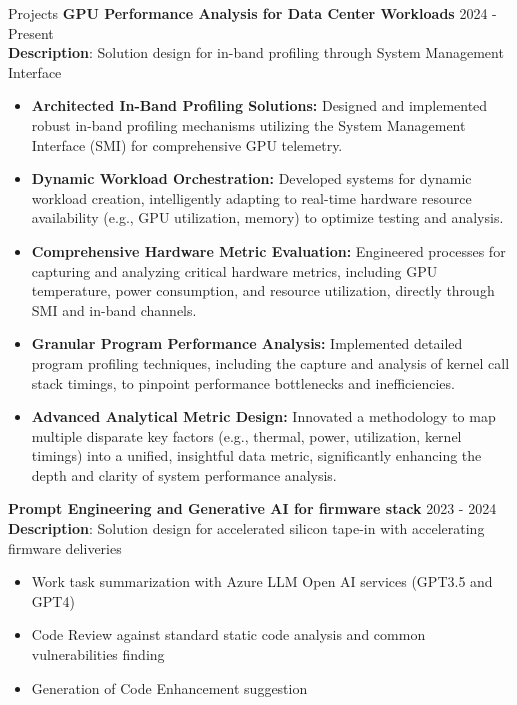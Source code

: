 \documentclass{resume} %
\begin{document}
\begin{rSection}{Projects}
{\bf GPU Performance Analysis for Data Center Workloads} \hfill {2024 - Present}\\
\textbf{Description}: Solution design for in-band profiling through System Management Interface

\begin{itemize}
    \item \textbf{Architected In-Band Profiling Solutions:} Designed and implemented robust in-band profiling mechanisms utilizing the System Management Interface (SMI) for comprehensive GPU telemetry.
    \item \textbf{Dynamic Workload Orchestration:} Developed systems for dynamic workload creation, intelligently adapting to real-time hardware resource availability (e.g., GPU utilization, memory) to optimize testing and analysis.
    \item \textbf{Comprehensive Hardware Metric Evaluation:} Engineered processes for capturing and analyzing critical hardware metrics, including GPU temperature, power consumption, and resource utilization, directly through SMI and in-band channels.
    \item \textbf{Granular Program Performance Analysis:} Implemented detailed program profiling techniques, including the capture and analysis of kernel call stack timings, to pinpoint performance bottlenecks and inefficiencies.
    \item \textbf{Advanced Analytical Metric Design:} Innovated a methodology to map multiple disparate key factors (e.g., thermal, power, utilization, kernel timings) into a unified, insightful data metric, significantly enhancing the depth and clarity of system performance analysis.
\end{itemize}

{\bf Prompt Engineering and Generative AI for firmware stack} \hfill {2023 - 2024}\\
\textbf{Description}: Solution design for accelerated silicon tape-in with accelerating firmware deliveries

\begin{itemize}
    \item Work task summarization with Azure LLM Open AI services (GPT3.5 and GPT4)
    \item Code Review against standard static code analysis and common vulnerabilities finding
    \item Generation of Code Enhancement suggestion 
\end{itemize}


\end{rSection}
\end{document}
